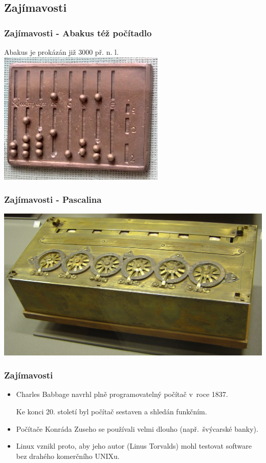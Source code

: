 \documentclass[xetex]{beamer}
\begin{document}
\subsection{Zajímavosti}


\begin{frame}
 \frametitle{Zajímavosti - Abakus též počítadlo} 
 Abakus je prokázán již 3000 př. n. l.
 \includegraphics[scale=0.9]{pic/abakus.jpg}
\end{frame}

\begin{frame}
 \frametitle{Zajímavosti - Pascalina}

 \includegraphics[scale=0.17]{pic/pascalina.jpg}
\end{frame}


\begin{frame}
 \frametitle{Zajímavosti}
 \begin{itemize}
 \item Charles Babbage navrhl plně programovatelný počítač v~roce 1837.
 
 Ke konci 20. století byl počítač sestaven a shledán funkčním.
 
 \item Počítače Konráda Zuseho se používali velmi dlouho (např.~švýcarské banky).
 \item Linux vznikl proto, aby jeho autor (Linus Torvalds) mohl testovat software bez drahého komerčního UNIXu.
 \end{itemize}
\end{frame}
\end{document}
